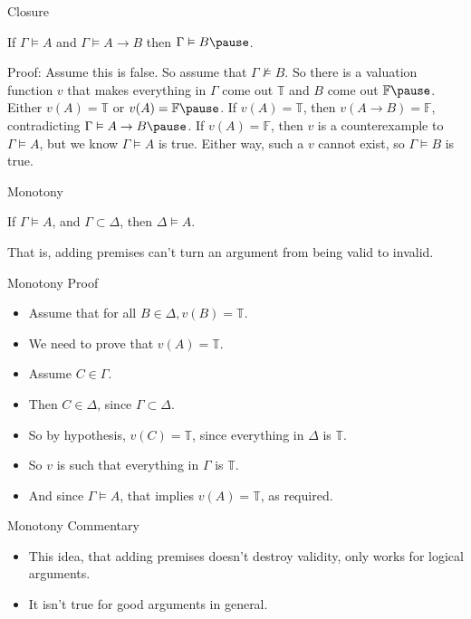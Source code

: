 \documentclass[
  ignorenonframetext,
]{beamer}
\providecommand{\tightlist}{%
  \setlength{\itemsep}{0pt}\setlength{\parskip}{0pt}}
\renewcommand{\,}{\text{, }}
\renewenvironment*{quote}	
	{\list{}{\rightmargin   \leftmargin} \item } 	
	{\endlist }
\def\True{\mathbb{T}}
\def\False{\mathbb{F}}
\begin{document}
\begin{frame}{Closure}
\protect\hypertarget{closure}{}
\begin{quote}
If \(\Gamma \vDash A\) and \(\Gamma \vDash A \rightarrow B\) then
\(\Gamma \vDash B \pause\).
\end{quote}

Proof: Assume this is false. So assume that \(\Gamma \nvDash B\). So
there is a valuation function \(v\) that makes everything in \(\Gamma\)
come out \(\True\) and \(B\) come out \(\False \pause\). Either
\(v(A) = \True\) or \(v(A) = \False \pause\). If \(v(A) = \True\), then
\(v(A \rightarrow B) = \False\), contradicting
\(\Gamma \vDash A \rightarrow B \pause\). If \(v(A) = \False\), then
\(v\) is a counterexample to \(\Gamma \vDash A\), but we know
\(\Gamma \vDash A\) is true. Either way, such a \(v\) cannot exist, so
\(\Gamma \vDash B\) is true.
\end{frame}

\begin{frame}{Monotony}
\protect\hypertarget{monotony}{}
\begin{quote}
If \(\Gamma \vDash A\), and \(\Gamma \subset \Delta\), then
\(\Delta \vDash A\).
\end{quote}

That is, adding premises can't turn an argument from being valid to
invalid.
\end{frame}

\begin{frame}{Monotony Proof}
\protect\hypertarget{monotony-proof}{}
\begin{itemize}
\tightlist
\item
  Assume that for all \(B \in \Delta, v(B) = \True\).
\item
  We need to prove that \(v(A) = \True\).\pause
\item
  Assume \(C \in \Gamma\).
\item
  Then \(C \in \Delta\), since \(\Gamma \subset \Delta\).\pause
\item
  So by hypothesis, \(v(C) = \True\), since everything in \(\Delta\) is
  \(\True\).\pause
\item
  So \(v\) is such that everything in \(\Gamma\) is \(\True\).\pause
\item
  And since \(\Gamma \vDash A\), that implies \(v(A) = \True\), as
  required.
\end{itemize}
\end{frame}

\begin{frame}{Monotony Commentary}
\protect\hypertarget{monotony-commentary}{}
\begin{itemize}
\tightlist
\item
  This idea, that adding premises doesn't destroy validity, only works
  for logical arguments.
\item
  It isn't true for good arguments in general.
\end{itemize}
\end{frame}
\end{document}
